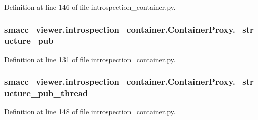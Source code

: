 Definition at line 146 of file introspection\+\_\+container.\+py.

\subsubsection[{\texorpdfstring{\+\_\+structure\+\_\+pub}{_structure_pub}}]{\setlength{\rightskip}{0pt plus 5cm}smacc\+\_\+viewer.\+introspection\+\_\+container.\+Container\+Proxy.\+\_\+structure\+\_\+pub\hspace{0.3cm}{\ttfamily [private]}}\hypertarget{classsmacc__viewer_1_1introspection__container_1_1ContainerProxy_a3bea5a75a0e6fe5533d7d4603c00bd8a}{}\label{classsmacc__viewer_1_1introspection__container_1_1ContainerProxy_a3bea5a75a0e6fe5533d7d4603c00bd8a}


Definition at line 131 of file introspection\+\_\+container.\+py.

\subsubsection[{\texorpdfstring{\+\_\+structure\+\_\+pub\+\_\+thread}{_structure_pub_thread}}]{\setlength{\rightskip}{0pt plus 5cm}smacc\+\_\+viewer.\+introspection\+\_\+container.\+Container\+Proxy.\+\_\+structure\+\_\+pub\+\_\+thread\hspace{0.3cm}{\ttfamily [private]}}\hypertarget{classsmacc__viewer_1_1introspection__container_1_1ContainerProxy_a00018ba687ca1270027dfec38c9de100}{}\label{classsmacc__viewer_1_1introspection__container_1_1ContainerProxy_a00018ba687ca1270027dfec38c9de100}


Definition at line 148 of file introspection\+\_\+container.\+py.

